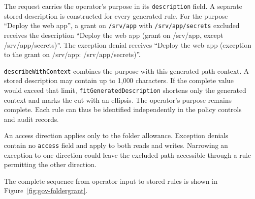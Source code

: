 The request carries the operator's purpose in its \texttt{description} field.
A separate stored description is constructed for every generated rule. For
the purpose ``Deploy the web app'', a grant on \texttt{/srv/app} with
\texttt{/srv/app/secrets} excluded receives the description ``Deploy the web
app (grant on /srv/app, except /srv/app/secrets)''. The exception denial
receives ``Deploy the web app (exception to the grant on /srv/app:
/srv/app/secrets)''.

\texttt{describeWithContext} combines the purpose with this generated
path context. A stored description may contain up to 1,000 characters. If the
complete value would exceed that limit,
\texttt{fitGeneratedDescription} shortens only the generated context and marks
the cut with an ellipsis. The operator's purpose remains complete. Each rule
can thus be identified independently in the policy controls and audit records.

An access direction applies only to the folder allowance. Exception denials
contain no \texttt{access} field and apply to both reads and writes. Narrowing
an exception to one direction could leave the excluded path accessible through
a rule permitting the other direction.

The complete sequence from operator input to stored rules is shown in
Figure~\ref{fig:gov-foldergrant}.

